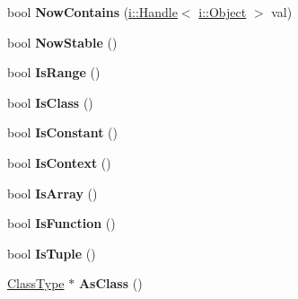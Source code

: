 \begin{DoxyCompactItemize}
\item 
bool {\bfseries Now\+Contains} (\hyperlink{classv8_1_1internal_1_1_handle}{i\+::\+Handle}$<$ \hyperlink{classv8_1_1internal_1_1_object}{i\+::\+Object} $>$ val)\hypertarget{classv8_1_1internal_1_1_type_ac25e0f6103786533f9a2f7a49f8b5396}{}\label{classv8_1_1internal_1_1_type_ac25e0f6103786533f9a2f7a49f8b5396}

\item 
bool {\bfseries Now\+Stable} ()\hypertarget{classv8_1_1internal_1_1_type_ae193709f34bec5e6720c2a757ab0b6ee}{}\label{classv8_1_1internal_1_1_type_ae193709f34bec5e6720c2a757ab0b6ee}

\item 
bool {\bfseries Is\+Range} ()\hypertarget{classv8_1_1internal_1_1_type_a4178cd64a3569dfaeb8e39e141ae451b}{}\label{classv8_1_1internal_1_1_type_a4178cd64a3569dfaeb8e39e141ae451b}

\item 
bool {\bfseries Is\+Class} ()\hypertarget{classv8_1_1internal_1_1_type_a5c9932d4efd98f0013da9c8c100e3d66}{}\label{classv8_1_1internal_1_1_type_a5c9932d4efd98f0013da9c8c100e3d66}

\item 
bool {\bfseries Is\+Constant} ()\hypertarget{classv8_1_1internal_1_1_type_a70ad7e29516dc5788308c234045c0c11}{}\label{classv8_1_1internal_1_1_type_a70ad7e29516dc5788308c234045c0c11}

\item 
bool {\bfseries Is\+Context} ()\hypertarget{classv8_1_1internal_1_1_type_ad49fd7e57811771b0e0a7135b79bc714}{}\label{classv8_1_1internal_1_1_type_ad49fd7e57811771b0e0a7135b79bc714}

\item 
bool {\bfseries Is\+Array} ()\hypertarget{classv8_1_1internal_1_1_type_a53b46b5bd2d1929c453b2dbfc6c82277}{}\label{classv8_1_1internal_1_1_type_a53b46b5bd2d1929c453b2dbfc6c82277}

\item 
bool {\bfseries Is\+Function} ()\hypertarget{classv8_1_1internal_1_1_type_a75fa04a0454919b745139d1e3ff16382}{}\label{classv8_1_1internal_1_1_type_a75fa04a0454919b745139d1e3ff16382}

\item 
bool {\bfseries Is\+Tuple} ()\hypertarget{classv8_1_1internal_1_1_type_a95c1b050f8341753e4c017851bd522d2}{}\label{classv8_1_1internal_1_1_type_a95c1b050f8341753e4c017851bd522d2}

\item 
\hyperlink{classv8_1_1internal_1_1_class_type}{Class\+Type} $\ast$ {\bfseries As\+Class} ()\hypertarget{classv8_1_1internal_1_1_type_a12c4b5f07fae19fbe2843e472a550d5d}{}\label{classv8_1_1internal_1_1_type_a12c4b5f07fae19fbe2843e472a550d5d}


\end{DoxyCompactItemize}
